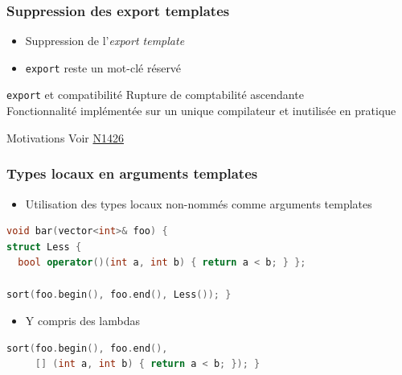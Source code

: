\documentclass[C++.tex]{subfiles}
\begin{document}
\begin{frame}[fragile]
	\frametitle{Suppression des export templates}
	\begin{itemize}
		\item Suppression de l'\textit{export template}
		\item \lstinline|export| reste un mot-clé réservé
	\end{itemize}

	\begin{block}{\lstinline|export| et compatibilité}
		Rupture de comptabilité ascendante\\
		Fonctionnalité implémentée sur un unique compilateur et inutilisée en pratique

	\end{block}

	\begin{block}{Motivations}
		Voir \href{http://www.open-std.org/jtc1/sc22/wg21/docs/papers/2003/n1426.pdf}{N1426}

	\end{block}
\end{frame}

\begin{frame}[fragile]
	\frametitle{Types locaux en arguments templates}
	\begin{itemize}
		\item Utilisation des types locaux non-nommés comme arguments templates
	\end{itemize}

	\begin{lstlisting}[language=C++]
void bar(vector<int>& foo) {
struct Less {
  bool operator()(int a, int b) { return a < b; } };

sort(foo.begin(), foo.end(), Less()); }\end{lstlisting}

	\begin{itemize}
		\item Y compris des lambdas
	\end{itemize}

	\begin{lstlisting}[language=C++]
sort(foo.begin(), foo.end(),
     [] (int a, int b) { return a < b; }); }\end{lstlisting}
\end{frame}
\end{document}

